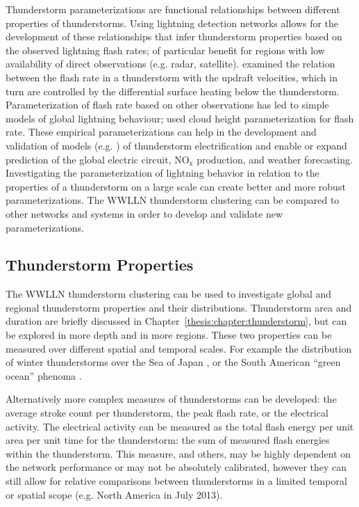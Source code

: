 Thunderstorm parameterizations are functional relationships between different properties of thunderstorms.
Using lightning detection networks allows for the development of these relationships that infer thunderstorm properties based on the observed lightning flash rates; of particular benefit for regions with low availability of direct observations (e.g. radar, satellite).
\citet{Zipser1994} examined the relation between the flash rate in a thunderstorm with the updraft velocities, which in turn are controlled by the differential surface heating below the thunderstorm.
Parameterization of flash rate based on other observations has led to simple models of global lightning behaviour; \citet{Price1992} used cloud height parameterization for flash rate.
These empirical parameterizations can help in the development and validation of models (e.g. \citet{Baker1999}) of thunderstorm electrification and enable or expand prediction of the global electric circuit, NO$_\text{x}$ production, and weather forecasting.
Investigating the parameterization of lightning behavior in relation to the properties of a thunderstorm on a large scale can create better and more robust parameterizations.
The WWLLN thunderstorm clustering can be compared to other networks and systems in order to develop and validate new parameterizations.

\subsection{Thunderstorm Properties}

The WWLLN thunderstorm clustering can be used to investigate global and regional thunderstorm properties and their distributions.
Thunderstorm area and duration are briefly discussed in Chapter~\ref{thesis:chapter:thunderstorm}, but can be explored in more depth and in more regions.
These two properties can be measured over different spatial and temporal scales.
For example the distribution of winter thunderstorms over the Sea of Japan \citep{Ishii2010}, or the South American ``green ocean'' phenoma \citep{Williams2002}.

Alternatively more complex measures of thunderstorms can be developed: the average stroke count per thunderstorm, the peak flash rate, or the electrical activity.
The electrical activity can be measured as the total flash energy per unit area per unit time for the thunderstorm: the sum of measured flash energies within the thunderstorm.
This measure, and others, may be highly dependent on the network performance or may not be absolutely calibrated, however they can still allow for relative comparisons between thunderstorms in a limited temporal or spatial scope (e.g. North America in July 2013).


